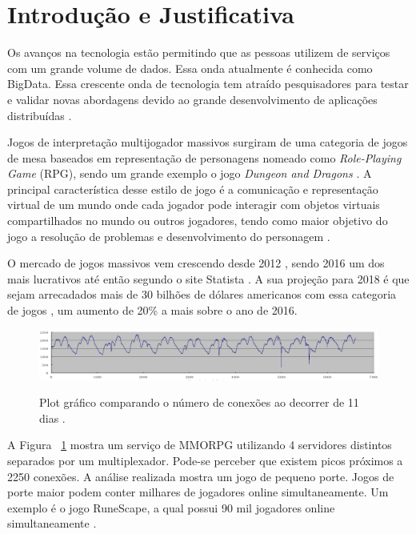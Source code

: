 \section{Introdução e Justificativa}
\label{sec:int}

Os avanços na tecnologia estão permitindo que as pessoas utilizem de serviços com um grande volume de dados. Essa onda atualmente é conhecida como BigData. Essa crescente onda de tecnologia tem atraído pesquisadores para testar e validar novas abordagens devido ao grande desenvolvimento de aplicações distribuídas \cite{mmo_analytic}.

Jogos de interpretação multijogador massivos surgiram de uma categoria de jogos de mesa baseados em representação de personagens nomeado como \textit{Role-Playing Game} (RPG), sendo um grande exemplo o jogo \textit{Dungeon and Dragons} \cite{tsr1980dungeons}. A principal característica desse estilo de jogo é a comunicação e representação virtual de um mundo onde cada jogador pode interagir com objetos virtuais compartilhados no mundo ou outros jogadores, tendo como maior objetivo do jogo a resolução de problemas e desenvolvimento do personagem \cite{video_game_technologies}.

O mercado de jogos massivos vem crescendo desde 2012 \cite{new_york_times}, sendo 2016 um dos mais lucrativos até então segundo o site Statista \cite{statista_2016}. A sua projeção para 2018 é que sejam arrecadados mais de 30 bilhões de dólares americanos com essa categoria de jogos \cite{statista_2018}, um aumento de 20\% a mais sobre o ano de 2016.

\begin{figure}[h]
\caption{Plot gráfico comparando o número de conexões ao decorrer de 11 dias
\cite{system_performance}.}
\centering
\includegraphics[width=1\textwidth]{img/connection_peer_hour.png}
\label{fig:conection_peer_hour}
\end{figure}

A Figura ~\ref{fig:conection_peer_hour} mostra um serviço de MMORPG utilizando 4 servidores distintos separados por um multiplexador. Pode-se perceber que existem picos próximos a 2250 conexões. A análise realizada \cite{system_performance} mostra um jogo de pequeno porte. Jogos de porte maior podem conter milhares de jogadores online simultaneamente. Um exemplo é o jogo RuneScape, a qual possui 90 mil jogadores online simultaneamente \cite{runescape_online_users}.

